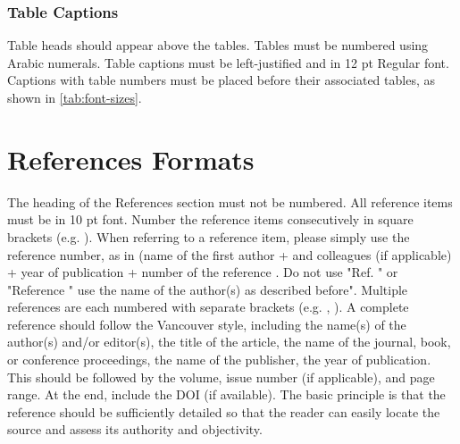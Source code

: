 \documentclass{siintec}
\begin{document}
\subsubsection{Table Captions}
Table heads should appear above the tables. Tables must be numbered using Arabic numerals. Table captions must be left-justified and in 12 pt Regular font. Captions with table numbers must be placed before their associated tables, as shown in \autoref{tab:font-sizes}.


\section{References Formats}
The heading of the References section must not be numbered. All reference items must be in 10 pt font. Number the reference items consecutively in square brackets (e.g. \cite{fogg2003}). When referring to a reference item, please simply use the reference number, as in (name of the first author + and colleagues (if applicable) + year of publication + number of the reference \cite{hirsh2002}.  Do not use "Ref. \cite{eckes2000}" or "Reference \cite{eckes2000}" use the name of the author(s) as described before".  Multiple references are each numbered with separate brackets (e.g. \cite{fogg2003}, \cite{hirsh2002,eckes2000}).
A complete reference should follow the Vancouver style, including the name(s) of the author(s) and/or editor(s), the title of the article, the name of the journal, book, or conference proceedings, the name of the publisher, the year of publication. This should be followed by the volume, issue number (if applicable), and page range. At the end, include the DOI (if available).
The basic principle is that the reference should be sufficiently detailed so that the reader can easily locate the source and assess its authority and objectivity.
\end{document}
